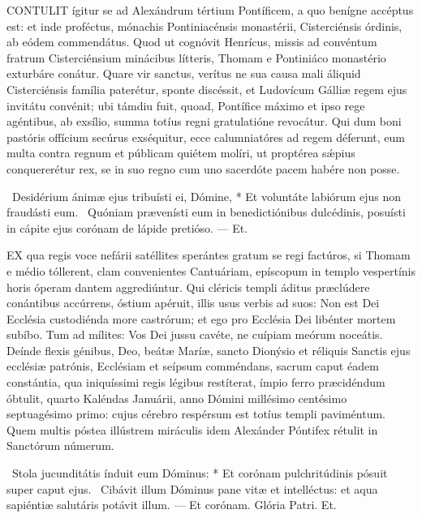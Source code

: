 \lettrine[lines=2]{C}{ONTULIT} ígitur se ad Alexándrum tértium Pontíficem, a quo benígne accéptus est: et inde proféctus, mónachis Pontiniacénsis monastérii, Cisterciénsis órdinis, ab eódem commendátus. Quod ut cognóvit Henrícus, missis ad convéntum fratrum Cisterciénsium minácibus lítteris, Thomam e Pontiniáco monastério exturbáre conátur. Quare vir sanctus, verítus ne sua causa mali áliquid Cisterciénsis família paterétur, sponte discéssit, et Ludovícum Gálliæ regem ejus invitátu convénit; ubi támdiu fuit, quoad, Pontífice máximo et ipso rege agéntibus, ab exsílio, summa totíus regni gratulatióne revocátur. Qui dum boni pastóris offícium secúrus exséquitur, ecce calumniatóres ad regem déferunt, eum multa contra regnum et públicam quiétem molíri, ut proptérea sǽpius conquererétur rex, se in suo regno cum uno sacerdóte pacem habére non posse.

\R\ Desidérium ánimæ ejus tribuísti ei, Dómine, * Et voluntáte labiórum ejus non fraudásti eum. \V\ Quóniam prævenísti eum in benedictiónibus dulcédinis, posuísti in cápite ejus corónam de lápide pretióso. --- Et.


\lettrine[lines=2]{E}{X} qua regis voce nefárii satéllites sperántes gratum se regi factúros, si Thomam e médio tóllerent, clam convenientes Cantuáriam, epíscopum in templo vespertínis horis óperam dantem aggrediúntur. Qui cléricis templi áditus præclúdere conántibus accúrrens, óstium apéruit, illis usus verbis ad suos: Non est Dei Ecclésia custodiénda more castrórum; et ego pro Ecclésia Dei libénter mortem subíbo. Tum ad mílites: Vos Dei jussu cavéte, ne cuípiam meórum noceátis. Deínde flexis génibus, Deo, beátæ Maríæ, sancto Dionýsio et réliquis Sanctis ejus ecclésiæ patrónis, Ecclésiam et seípsum comméndans, sacrum caput éadem constántia, qua iniquíssimi regis légibus restíterat, ímpio ferro præcidéndum óbtulit, quarto Kaléndas Januárii, anno Dómini millésimo centésimo septuagésimo primo: cujus cérebro respérsum est totíus templi paviméntum. Quem multis póstea illústrem miráculis idem Alexánder Póntifex rétulit in Sanctórum númerum.

\R\ Stola jucunditátis índuit eum Dóminus: * Et corónam pulchritúdinis pósuit super caput ejus. \V\ Cibávit illum Dóminus pane vitæ et intelléctus: et aqua sapiéntiæ salutáris potávit illum. --- Et corónam. Glória Patri. Et.



